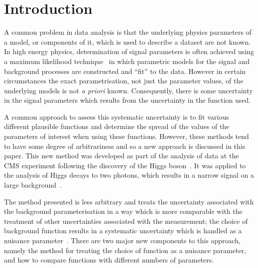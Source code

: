 \section{Introduction} %
\label{sec:introduction}


A common problem in data analysis is that the underlying physics parameters of a model, or components of it, which is used to describe a dataset
are not known. In high energy physics, determination of signal parameters is
often achieved using a maximum likelihood technique~\cite{ref:Fisher01011922}
in which parametric models for the signal and background processes are constructed and
``fit'' to the data. However in certain circumstances the exact parametrisation, not just the parameter
values, of the underlying models is not {\it a priori} known. Consequently, there is some uncertainty in the signal parameters which results from the uncertainty in the function used.

A common approach to assess this systematic uncertainty is to fit various different plausible functions and
determine the spread of the values of the  parameters of interest when using these functions.
However, these methods tend to have some degree of arbitrariness and so
a new approach is discussed in this paper.
This new method was developed as part of the analysis of data at the CMS experiment
following the discovery of the Higgs
boson~\cite{ref:introduction:atlasdis,ref:introduction:cmsdis}.
It was applied to the analysis of Higgs decays to two photons, which
results in a narrow signal on a large
background~\cite{ref:introduction:legacy}.

The method presented is less
arbitrary and treats the uncertainty associated with the
background parameterisation in a way
which is more comparable with the treatment of other
uncertainties associated with the measurement; the choice of background
function results in a systematic uncertainty
which is handled as a nuisance parameter~\cite{ref:intro:nusiances}.
There are two major new components to this approach, namely the method for
treating the choice of function as a nuisance parameter, and how to compare
functions with different numbers of parameters.

